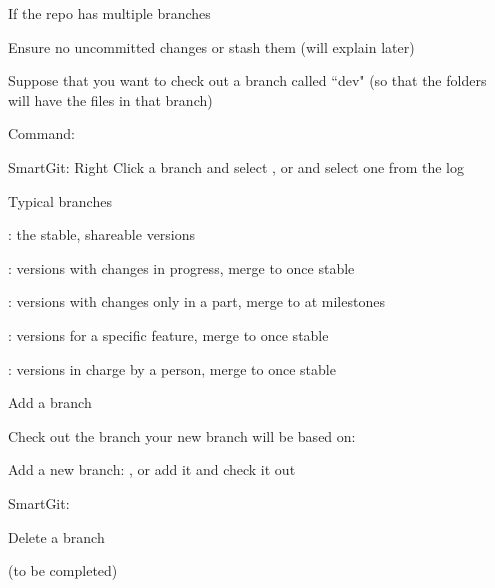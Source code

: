 \documentclass[hyperref,compress,handout,9pt,usepdftitle=false]{beamer}
\begin{document}
\begin{frame}{If the repo has multiple branches}
\begin{witemize}
\item Ensure no uncommitted changes or stash them (will explain later)
\item Suppose that you want to check out a branch called ``dev" (so that the folders will have the files in that branch)
\item Command: 
\item SmartGit: Right Click a branch and select , or  and select one from the log
\end{witemize}
\end{frame}

\begin{frame}{Typical branches}
\begin{witemize}
\item {}: the stable, shareable versions
\item {}: versions with changes in progress, merge to  once stable
\item {}: versions with changes only in a part, merge to  at milestones
\item {}: versions for a specific feature, merge to  once stable
\item {}: versions in charge by a person, merge to  once stable
\end{witemize}
\end{frame}

\begin{frame}{Add a branch}
\begin{witemize}
\item Check out the branch your new branch will be based on: 
\item Add a new branch: , or add it and check it out 
\item SmartGit: 
\end{witemize}
\end{frame}

\begin{frame}{Delete a branch}
\begin{witemize}
\item (to be completed)
\end{witemize}
\end{frame}
\end{document}
